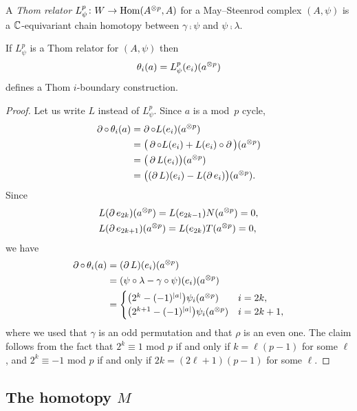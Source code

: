 A \textit{Thom relator} $L_\psi^p \colon W \to \mathrm{Hom}(A^{\otimes p}, A)$ for a May--Steenrod complex $(A, \psi)$ is a $\mathbb{C}$-equivariant chain homotopy between $\gamma \comp \psi$ and $\psi \comp \lambda$.

\begin{theorem*}
	If $L_\psi^p$ is a Thom relator for $(A, \psi)$ then
	\[
	\theta_i(a) = L_\psi^p(e_i)(a^{\otimes p})
	\]
	defines a Thom $i$-boundary construction.
\end{theorem*}

\begin{proof}
	Let us write $L$ instead of $L_\psi^p$.
	Since $a$ is a mod~$p$ cycle,
	\begin{align*}
		\operatorname{\partial} \mathbin{\circ}\, \theta_i(a) & =
		\operatorname{\partial} \mathbin{\circ} L(e_i)(a^{\otimes p}) \\ & =
		\big(\operatorname{\partial} \mathbin{\circ} L(e_i) + L(e_i) \mathbin{\circ} \operatorname{\partial} \big) (a^{\otimes p}) \\ & =
		\big(\operatorname{\partial} L(e_i)\big)(a^{\otimes p}) \\ & =
		\big((\operatorname{\partial} L)(e_i) - L(\operatorname{\partial} e_i)\big)(a^{\otimes p}).
	\end{align*}
	Since
	\begin{align*}
		&L(\operatorname{\partial} e_{2k})(a^{\otimes p}) = L(e_{2k-1}) N(a^{\otimes p}) = 0, \\
		&L(\operatorname{\partial} e_{2k+1})(a^{\otimes p}) = L(e_{2k}) T(a^{\otimes p}) = 0,
	\end{align*}
	we have
	\begin{align*}
		\operatorname{\partial} \mathbin{\circ}\, \theta_i(a) & =
		(\operatorname{\partial} L)(e_i)(a^{\otimes p}) \\ & =
		(\psi \mathbin{\circ} \lambda - \gamma \mathbin{\circ} \psi)(e_i)(a^{\otimes p}) \\ & =
		\begin{cases}
			\big(2^k - (-1)^{\lvert a\rvert}\big) \psi_i(a^{\otimes p}) & i=2k, \\
			\big(2^{k+1} - (-1)^{\lvert a\rvert}\big) \psi_i(a^{\otimes p}) & i=2k+1,
		\end{cases}
	\end{align*}
	where we used that $\gamma$ is an odd permutation and that $\rho$ is an even one.
	The claim follows from the fact that $2^k \equiv 1$ mod $p$ if and only if $k = \ell(p-1)$ for some $\ell$, and $2^k \equiv -1$ mod $p$ if and only if $2k = (2\ell+1)(p-1)$ for some $\ell$.
\end{proof}

\subsection{The homotopy $M$}


